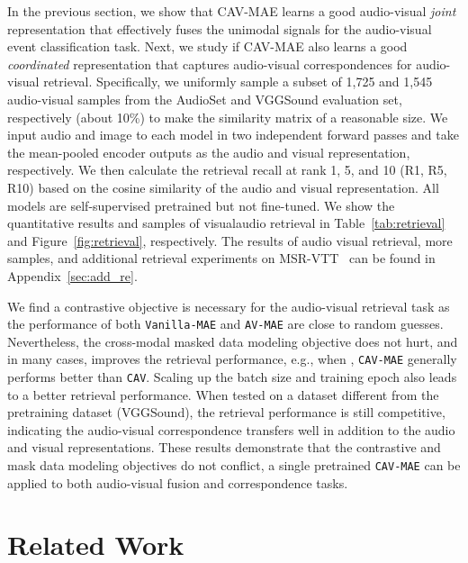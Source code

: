 \documentclass{article} \usepackage{iclr2023_conference,times}
\begin{document}
In the previous section, we show that CAV-MAE learns a good audio-visual \emph{joint} representation that effectively fuses the unimodal signals for the audio-visual event classification task. Next, we study if CAV-MAE also learns a good \emph{coordinated} representation that captures audio-visual correspondences for audio-visual retrieval. Specifically, we uniformly sample a subset of 1,725 and 1,545 audio-visual samples from the AudioSet and VGGSound evaluation set, respectively (about 10\%) to make the similarity matrix of a reasonable size. We input audio and image to each model in two independent forward passes and take the mean-pooled encoder outputs as the audio and visual representation, respectively. We then calculate the retrieval recall at rank 1, 5, and 10 (R1, R5, R10) based on the cosine similarity of the audio and visual representation. All models are self-supervised pretrained but not fine-tuned. We show the quantitative results and samples of visualaudio retrieval in Table~\ref{tab:retrieval} and Figure~\ref{fig:retrieval}, respectively. The results of audio visual retrieval, more samples, and additional retrieval experiments on MSR-VTT~\citep{xu2016msr} can be found in Appendix~\ref{sec:add_re}. 

We find a contrastive objective is necessary for the audio-visual retrieval task as the performance of both \texttt{Vanilla-MAE} and \texttt{AV-MAE} are close to random guesses. Nevertheless, the cross-modal masked data modeling objective does not hurt, and in many cases, improves the retrieval performance, e.g., when , \texttt{CAV-MAE} generally performs better than \texttt{CAV}. Scaling up the batch size and training epoch also leads to a better retrieval performance. When tested on a dataset different from the pretraining dataset (VGGSound), the retrieval performance is still competitive, indicating the audio-visual correspondence transfers well in addition to the audio and visual representations. These results demonstrate that the contrastive and mask data modeling objectives do not conflict, a single pretrained \texttt{CAV-MAE} can be applied to both audio-visual fusion and correspondence tasks.

\vspace{-1mm}
\section{Related Work}
\end{document}
